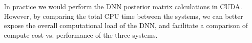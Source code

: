 \documentclass{article}
\begin{document}
In practice we would perform the DNN posterior matrix calculations in
CUDA.
However, by comparing the total CPU time between the systems, we can
better expose the overall computational load of the DNN, and facilitate
a comparison of compute-cost vs. performance of the three systems. 





%
\end{document}

